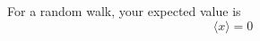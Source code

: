 \documentclass[12pt]{article}
\begin{document}
For a random walk, your expected value is
\begin{equation}
\langle x \rangle = 0
\end{equation}
\end{document}

